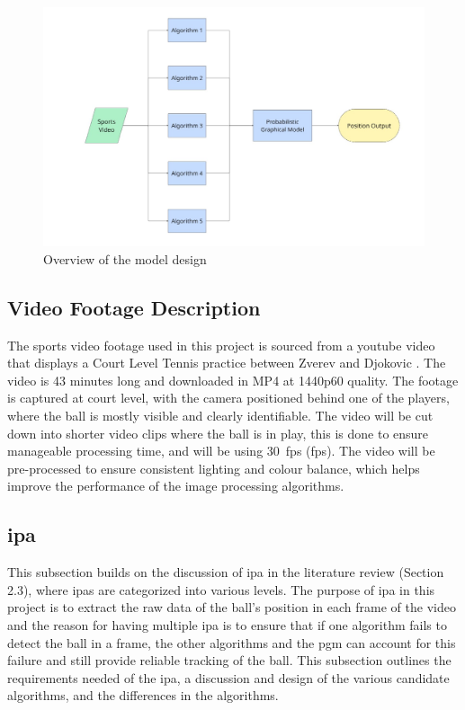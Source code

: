 \documentclass[12pt,a4paper]{article}
\begin{document}
\begin{figure}[H]
	\centering
	\includegraphics[width=1\textwidth]{ProjectOverview.jpg}
	\caption{Overview of the model design}
	\label{fig:model_overview}
\end{figure}

\subsection{Video Footage Description}

The sports video footage used in this project is sourced from a youtube video that displays a Court Level Tennis practice between Zverev and Djokovic \parencite{youtube_ZverevDjokovic}. The video is 43 minutes long and downloaded in MP4 at 1440p60 quality. The footage is captured at court level, with the camera positioned behind one of the players, where the ball is mostly visible and clearly identifiable. The video will be cut down into shorter video clips where the ball is in play, this is done to ensure manageable processing time, and will be using 30~\acl{fps} (\acs{fps}). The video will be pre-processed to ensure consistent lighting and colour balance, which helps improve the performance of the image processing algorithms.

\subsection{\acl{ipa}}
This subsection builds on the discussion of \acs{ipa} in the literature review (Section 2.3), where \acs{ipa}s are categorized into various levels. The purpose of \acs{ipa} in this project is to extract the raw data of the ball's position in each frame of the video and the reason for having multiple \acs{ipa} is to ensure that if one algorithm fails to detect the ball in a frame, the other algorithms and the \acs{pgm} can account for this failure and still provide reliable tracking of the ball. This subsection outlines the requirements needed of the \acs{ipa}, a discussion and design of the various candidate algorithms, and the differences in the algorithms. 
\end{document}
